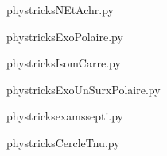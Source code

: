 
    \newcommand{\CaptionFigNEtAchr}{<+Type your caption here+>}
    \begin{center}
        
    \end{center}
    phystricksNEtAchr.py

    

    \clearpage
    


    \newcommand{\CaptionFigExoPolaire}{<+Type your caption here+>}
    \begin{center}
        
    \end{center}
    phystricksExoPolaire.py

    

    \clearpage
    


    \newcommand{\CaptionFigIsomCarre}{<+Type your caption here+>}
    \begin{center}
        
    \end{center}
    phystricksIsomCarre.py

    

    \clearpage
    


    \newcommand{\CaptionFigExoUnSurxPolaire}{<+Type your caption here+>}
    \begin{center}
        
    \end{center}
    phystricksExoUnSurxPolaire.py

    

    \clearpage
    


    \newcommand{\CaptionFigexamssepti}{<+Type your caption here+>}
    \begin{center}
        
    \end{center}
    phystricksexamssepti.py

    

    \clearpage
    


    \newcommand{\CaptionFigCercleTnu}{<+Type your caption here+>}
    \begin{center}
        
    \end{center}
    phystricksCercleTnu.py

